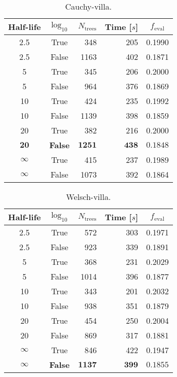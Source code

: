 
\begin{table}[]
  \begin{tabular}{@{}ccrrc@{}}
    Half-life & $\log_{10}$ & $N_\mathrm{trees}$ & Time [$s$] & $f_\mathrm{eval}$ \\
    \midrule
    \num{2.5} & True & \num{348} & \num{205} & \num{0.1990} \\
    \num{2.5} & False & \num{1163} & \num{402} & \num{0.1871} \\
    \num{5} & True & \num{345} & \num{206} & \num{0.2000} \\
    \num{5} & False & \num{964} & \num{376} & \num{0.1869} \\
    \num{10} & True & \num{424} & \num{235} & \num{0.1992} \\
    \num{10} & False & \num{1139} & \num{398} & \num{0.1859} \\
    \num{20} & True & \num{382} & \num{216} & \num{0.2000} \\
    $\mathbf{20}$ & \textbf{False} & $\mathbf{1251}$ & $\mathbf{438}$ & $\mathbf{0.1848}$ \\
    $\infty$ & True & \num{415} & \num{237} & \num{0.1989} \\
    $\infty$ & False & \num{1073} & \num{392} & \num{0.1864} \\
  \end{tabular}
  \caption{\label{tab:h:HPO_initial_Cauchy-villa}Cauchy-villa.}
\end{table}


\begin{table}[]
  \begin{tabular}{@{}ccrrc@{}}
    Half-life & $\log_{10}$ & $N_\mathrm{trees}$ & Time [$s$] & $f_\mathrm{eval}$ \\
    \midrule
    \num{2.5} & True & \num{572} & \num{303} & \num{0.1971} \\
    \num{2.5} & False & \num{923} & \num{339} & \num{0.1891} \\
    \num{5} & True & \num{368} & \num{231} & \num{0.2029} \\
    \num{5} & False & \num{1014} & \num{396} & \num{0.1877} \\
    \num{10} & True & \num{343} & \num{201} & \num{0.2032} \\
    \num{10} & False & \num{938} & \num{351} & \num{0.1879} \\
    \num{20} & True & \num{454} & \num{250} & \num{0.2004} \\
    \num{20} & False & \num{869} & \num{317} & \num{0.1881} \\
    $\infty$ & True & \num{846} & \num{422} & \num{0.1947} \\
    $\bm{\infty}$ & \textbf{False} & $\mathbf{1137}$ & $\mathbf{399}$ & $\mathbf{0.1855}$ \\
  \end{tabular}
  \caption{\label{tab:h:HPO_initial_Welsch-villa}Welsch-villa.}
\end{table}

